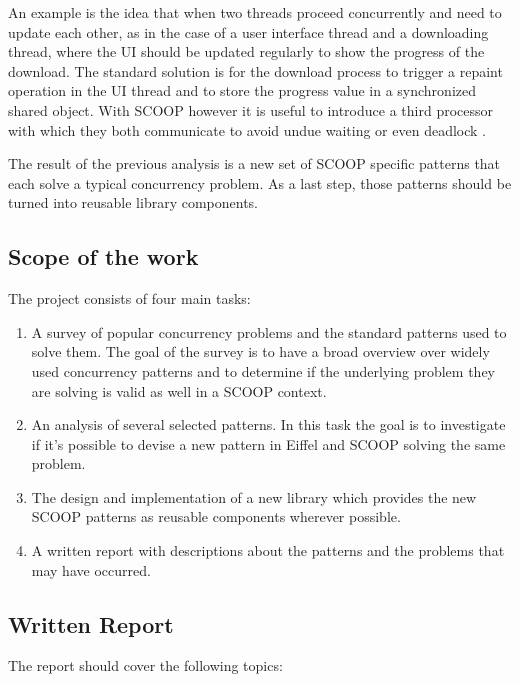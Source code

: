 \documentclass[a4paper,10pt]{article}
\begin{document}
An example is the idea that when two threads proceed concurrently and need to update each other, 
as in the case of a user interface thread and a downloading thread, where the UI should be updated regularly to show the progress of the download.
The standard solution is for the download process to trigger a repaint operation in the UI thread and to store the progress value in a synchronized shared object.
With SCOOP however it is useful to introduce a third processor with which they both communicate to avoid undue waiting or even deadlock \cite{taskCancellation13}.

The result of the previous analysis is a new set of SCOOP specific patterns that each solve a typical concurrency problem. 
As a last step, those patterns should be turned into reusable library components.

\subsection {Scope of the work}

The project consists of four main tasks:

\begin {enumerate}
\item A survey of popular concurrency problems and the standard patterns used to solve them.
The goal of the survey is to have a broad overview over widely used concurrency patterns and to determine if the underlying problem they are solving is valid as well in a SCOOP context.
\item An analysis of several selected patterns. In this task the goal is to investigate if it’s possible to devise a new pattern in Eiffel and SCOOP solving the same problem.
\item The design and implementation of a new library which provides the new SCOOP patterns as reusable components wherever possible.
\item A written report with descriptions about the patterns and the problems that may have occurred.
\end {enumerate}

\subsection {Written Report}
\label {sec:written_report}
The report should cover the following topics:
\end{document}
